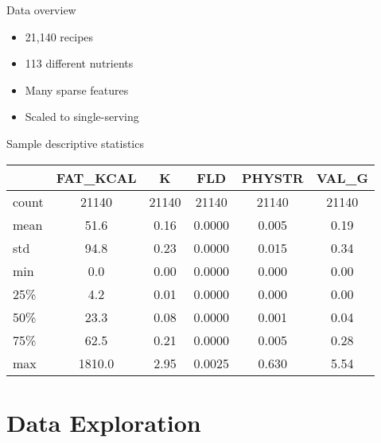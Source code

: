 \documentclass{beamer}
\begin{document}
\begin{frame}{Data overview}
	\begin{block}{}
		\begin{itemize}
			\item 21,140 recipes
			\item 113 different nutrients
			\item Many sparse features
			\item Scaled to single-serving
		\end{itemize}
	\end{block}			
	\begin{block}{Sample descriptive statistics}
		\centering
		\small
		\begin{tabular}{lccccc}
			{} &  FAT\_KCAL &         K &         FLD &     PHYSTR &     VAL\_G \\
			\hline
			count &   21140 &  21140 &  21140 &  21140 &  21140 \\
			mean  &      51.6 &      0.16 &      0.0000 &      0.005 &      0.19 \\
			std   &      94.8 &      0.23 &      0.0000 &      0.015 &      0.34 \\
			min   &       0.0 &      0.00 &      0.0000 &      0.000 &      0.00 \\
			25\%   &       4.2 &      0.01 &      0.0000 &      0.000 &      0.00 \\
			50\%   &      23.3 &      0.08 &      0.0000 &      0.001 &      0.04 \\
			75\%   &      62.5 &      0.21 &      0.0000 &      0.005 &      0.28 \\
			max   &    1810.0 &      2.95 &      0.0025 &      0.630 &      5.54 \\
		\end{tabular}
		
	\end{block}
	
		 
	
\end{frame}



\section{Data Exploration}
\end{document}
